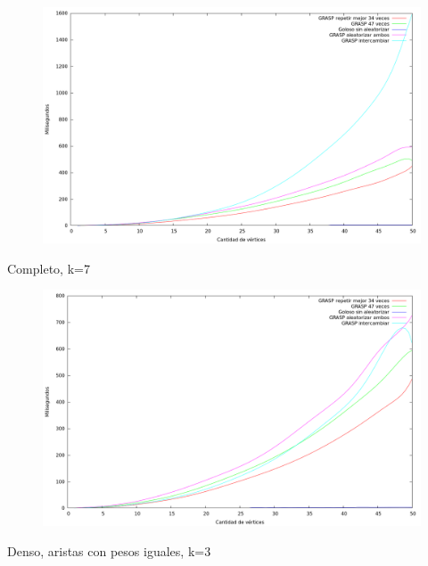 \begin{figure}[H]
  \begin{center}
    \includegraphics[scale=0.35]{imagenes/ej6-completo-k3-tiempo.png}
  \end{center}
\end{figure}

Completo, k=7

\begin{figure}[H]
  \begin{center}
    \includegraphics[scale=0.35]{imagenes/ej6-completo-k7-tiempo.png}
  \end{center}
\end{figure}

Denso, aristas con pesos iguales, k=3

